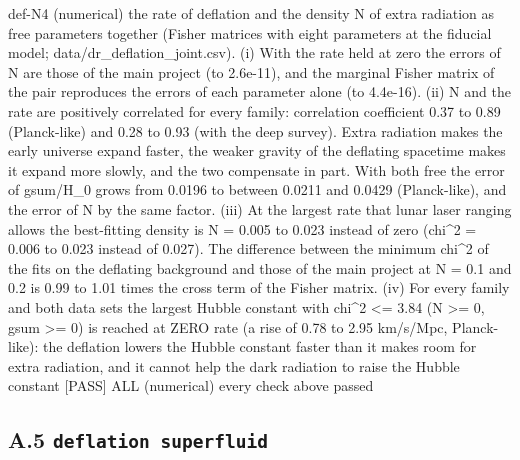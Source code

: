 \documentclass[
  10pt,
]{article}
\newenvironment{Shaded}{}{}
\newcommand{\NormalTok}[1]{#1}
\begin{document}
\begin{Shaded}
\begin{Highlighting}[]
\NormalTok{[PASS] def{-}N4  (numerical) the rate of deflation and the density N of extra radiation as free parameters together (Fisher matrices with eight parameters at the fiducial model; data/dr\_deflation\_joint.csv). (i) With the rate held at zero the errors of N are those of the main project (to 2.6e{-}11), and the marginal Fisher matrix of the pair reproduces the errors of each parameter alone (to 4.4e{-}16). (ii) N and the rate are positively correlated for every family: correlation coefficient 0.37 to 0.89 (Planck{-}like) and 0.28 to 0.93 (with the deep survey). Extra radiation makes the early universe expand faster, the weaker gravity of the deflating spacetime makes it expand more slowly, and the two compensate in part. With both free the error of gsum/H\_0 grows from 0.0196 to between 0.0211 and 0.0429 (Planck{-}like), and the error of N by the same factor. (iii) At the largest rate that lunar laser ranging allows the best{-}fitting density is N = 0.005 to 0.023 instead of zero (chi\^{}2 = 0.006 to 0.023 instead of 0.027). The difference between the minimum chi\^{}2 of the fits on the deflating background and those of the main project at N = 0.1 and 0.2 is 0.99 to 1.01 times the cross term of the Fisher matrix. (iv) For every family and both data sets the largest Hubble constant with chi\^{}2 \textless{}= 3.84 (N \textgreater{}= 0, gsum \textgreater{}= 0) is reached at ZERO rate (a rise of 0.78 to 2.95 km/s/Mpc, Planck{-}like): the deflation lowers the Hubble constant faster than it makes room for extra radiation, and it cannot help the dark radiation to raise the Hubble constant}
\NormalTok{[PASS] ALL  (numerical) every check above passed}
\end{Highlighting}
\end{Shaded}

\hypertarget{a.5-deflation-superfluid}{%
\subsection{\texorpdfstring{A.5
\texttt{deflation\ superfluid}}{A.5 deflation superfluid}}\label{a.5-deflation-superfluid}}
\end{document}
